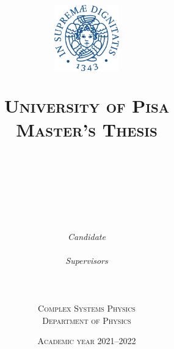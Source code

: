 \title{
  \begin{figure}[h]
    \centering
    \includegraphics[width=0.25\textwidth]{figures/unipi_logo.pdf}
  \end{figure}
  \textsc{University of Pisa}\\
  \textsc{Master's Thesis}\\



  \hrulefill \\
  \vspace{8pt}
  \Huge \textbf{\Title} \\
  \hrulefill \\
  \vspace{20pt}
}


\author{
  \begin{minipage}[h]{0.45\linewidth}
    \begin{flushleft}
      \textit{Candidate} \\
      \textbf{\Luca}
    \end{flushleft}
  \end{minipage}
  \begin{minipage}[h]{0.45\linewidth}
    \begin{flushright}
      \textit{Supervisors} \\
      \textbf{\Florent} \\
      \textbf{\Bruno}
    \end{flushright}
  \end{minipage}
  \vspace{30pt} \\
  \textsc{Complex Systems Physics}\\
  \textsc{Department of Physics}
}
\date{\textsc{Academic year 2021--2022}}
  
